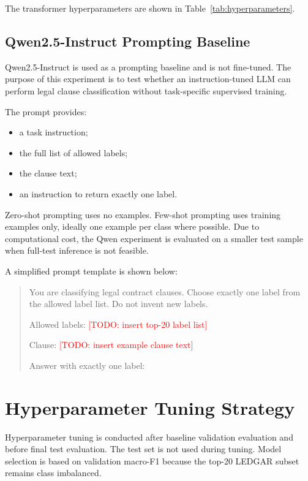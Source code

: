 \documentclass[11pt]{article}
\newcommand{\todo}[1]{\textcolor{red}{[TODO: #1]}}
\begin{document}
The transformer hyperparameters are shown in Table~\ref{tab:hyperparameters}.

\subsection{Qwen2.5-Instruct Prompting Baseline}

Qwen2.5-Instruct is used as a prompting baseline and is not fine-tuned. The purpose of this experiment is to test whether an instruction-tuned LLM can perform legal clause classification without task-specific supervised training.

The prompt provides:

\begin{itemize}[leftmargin=*]
    \item a task instruction;
    \item the full list of allowed labels;
    \item the clause text;
    \item an instruction to return exactly one label.
\end{itemize}

Zero-shot prompting uses no examples. Few-shot prompting uses training examples only, ideally one example per class where possible. Due to computational cost, the Qwen experiment is evaluated on a smaller test sample when full-test inference is not feasible.

A simplified prompt template is shown below:

\begin{quote}
You are classifying legal contract clauses. Choose exactly one label from the allowed label list. Do not invent new labels.

Allowed labels: \todo{insert top-20 label list}

Clause: \todo{insert example clause text}

Answer with exactly one label:
\end{quote}


\section{Hyperparameter Tuning Strategy}

Hyperparameter tuning is conducted after baseline validation evaluation and before final test evaluation. The test set is not used during tuning. Model selection is based on validation macro-F1 because the top-20 LEDGAR subset remains class imbalanced.
\end{document}
